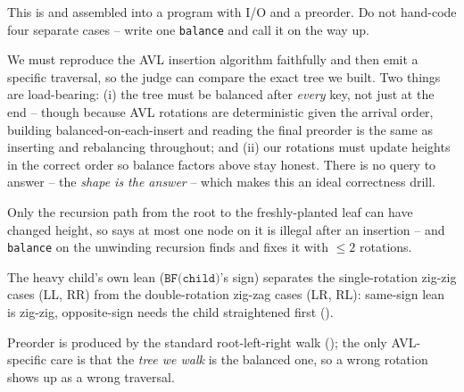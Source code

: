 \begin{attemptgate}
This is  and  assembled into a program with I/O and a preorder.
Do not hand-code four separate cases -- write one \texttt{balance} and call it on the way up.
\end{attemptgate}

We must reproduce the AVL insertion algorithm faithfully and then emit a specific traversal, so the
judge can compare the exact tree we built. Two things are load-bearing: (i) the tree must be balanced
after \emph{every} key, not just at the end -- though because AVL rotations are deterministic given the
arrival order, building balanced-on-each-insert and reading the final preorder is the same as inserting
and rebalancing throughout; and (ii) our rotations must update heights in the correct order so balance
factors above stay honest. There is no query to answer -- the \emph{shape is the answer} -- which makes
this an ideal correctness drill.

\begin{observation}
Only the recursion path from the root to the freshly-planted leaf can have changed height, so
 says at most one node on it is illegal after an insertion -- and \texttt{balance}
on the unwinding recursion finds and fixes it with $\le 2$ rotations.
\end{observation}
\begin{observation}
The heavy child's own lean ($\texttt{BF(child)}$'s sign) separates the single-rotation zig-zig cases
(LL, RR) from the double-rotation zig-zag cases (LR, RL): same-sign lean is zig-zig, opposite-sign needs
the child straightened first ().
\end{observation}
\begin{observation}
Preorder is produced by the standard root-left-right walk (); the only AVL-specific care is
that the \emph{tree we walk} is the balanced one, so a wrong rotation shows up as a wrong traversal.
\end{observation}

